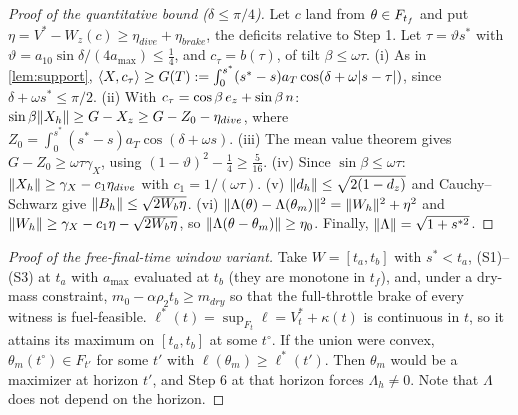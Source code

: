 \begin{proof}[Proof of the quantitative bound ($\delta\le\pi/4$)]
Let $c$ land from $\theta\in F_{t_f}$ and put $\eta=V^*-W_z(c)\ge\eta_{dive}+\eta_{brake}$, the deficits relative to Step 1. Let $\tau=\vartheta s^*$ with
$\vartheta=a_{10}\sin\delta/(4a_{\max})\le\tfrac14$, and $c_\tau=b(\tau)$, of tilt $\beta\le\omega\tau$.
(i) As in \cref{lem:support}, $\langle X,c_\tau\rangle\ge G(T):=\int_0^{s^*}(s^*-s)a_T\cos(\delta+\omega|s-\tau|)$, since $\delta+\omega s^*\le\pi/2$.
(ii) With $c_\tau=\cos\beta\,e_z+\sin\beta\,n$: $\sin\beta\lVert X_h\rVert\ge G-X_z\ge G-Z_0-\eta_{dive}$, where $Z_0=\int_0^{s^*}(s^*-s)a_T\cos(\delta+\omega s)$.
(iii) The mean value theorem gives $G-Z_0\ge\omega\tau\gamma_X$, using $(1-\vartheta)^2-\tfrac14\ge\tfrac5{16}$.
(iv) Since $\sin\beta\le\omega\tau$: $\lVert X_h\rVert\ge\gamma_X-c_1\eta_{dive}$ with $c_1=1/(\omega\tau)$.
(v) $\lVert d_h\rVert\le\sqrt{2(1-d_z)}$ and Cauchy--Schwarz give $\lVert B_h\rVert\le\sqrt{2W_b\eta}$.
(vi) $\lVert \Lambda(\theta)-\Lambda(\theta_m)\rVert^2=\lVert W_h\rVert^2+\eta^2$ and $\lVert W_h\rVert\ge\gamma_X-c_1\eta-\sqrt{2W_b\eta}$, so
$\lVert \Lambda(\theta-\theta_m)\rVert\ge\eta_0$. Finally, $\lVert \Lambda\rVert=\sqrt{1+s^{*2}}$.
\end{proof}

\begin{proof}[Proof of the free-final-time window variant]
Take $W=[t_a,t_b]$ with $s^*<t_a$, (S1)--(S3) at $t_a$ with $a_{\max}$ evaluated at $t_b$ (they are monotone in $t_f$), and, under a
dry-mass constraint, $m_0-\alpha\rho_2t_b\ge m_{dry}$ so that the full-throttle brake of every witness is fuel-feasible.
$\ell^*(t)=\sup_{F_t}\ell=V^*_t+\kappa(t)$ is continuous in $t$, so it attains its maximum on $[t_a,t_b]$ at some $t^\circ$. If the union were
convex, $\theta_m(t^\circ)\in F_{t'}$ for some $t'$ with $\ell(\theta_m)\ge\ell^*(t')$. Then $\theta_m$ would be a maximizer at horizon $t'$, and
Step 6 at that horizon forces $\Lambda_h\ne0$. Note that $\Lambda$ does not depend on the horizon.
\end{proof}
